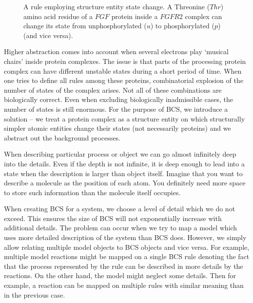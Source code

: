 \documentclass[12pt, twoside]{fithesis2} %
\begin{document}
\begin{figure}[!h]
\begin{center}
\end{center}
\caption{A rule employing structure entity state change. A Threonine ($Thr$) amino acid residue of a $FGF$ protein inside a $FGFR2$ complex can change its state from unphosphorylated ($u$) to phosphorylated ($p$) (and vice versa).}\label{rule_example}
\end{figure}

Higher abstraction comes into account when several electrons play `musical chairs' inside protein complexes. The issue is that parts of the processing protein complex can have different unstable states during a short period of time. When one tries to define all rules among these proteins, combinatorial explosion of the number of states of the complex arises. Not all of these combinations are biologically correct. Even when excluding biologically inadmissible cases, the number of states is still enormous. For the purpose of BCS, we introduce a solution -- we treat a protein complex as a structure entity on which structurally simpler atomic entities change their states (not necessarily proteins) and we abstract out the background processes.

When describing particular process or object we can go almost infinitely deep into the details. Even if the depth is not infinite, it is deep enough to lead into a state when the description is larger than object itself. Imagine that you want to describe a molecule as the position of each atom. You definitely need more space to store such information than the molecule itself occupies.

When creating BCS for a system, we choose a level of detail which we do not exceed. This ensures the size of BCS will not exponentially increase with additional details. The problem can occur when we try to map a model which uses more detailed description of the system than BCS does. However, we simply allow relating multiple model objects to BCS objects and vice versa. For example, multiple model reactions might be mapped on a single BCS rule denoting the fact that the process represented by the rule can be described in more details by the reactions. On the other hand, the model might neglect some details. Then for example, a reaction can be mapped on multiple rules with similar meaning than in the previous case.
\end{document}
